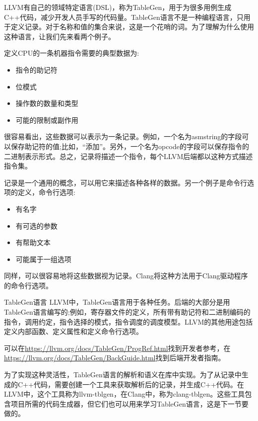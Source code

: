 LLVM有自己的领域特定语言(DSL)，称为TableGen，用于为很多用例生成C++代码，减少开发人员手写的代码量。TableGen语言不是一种编程语言，只用于定义记录。对于名称和值的集合来说，这是一个花哨的词。为了理解为什么使用这种语言，让我们先来看两个例子。

定义CPU的一条机器指令需要的典型数据为:

\begin{itemize}
\item
指令的助记符

\item
位模式

\item
操作数的数量和类型

\item
可能的限制或副作用
\end{itemize}

很容易看出，这些数据可以表示为一条记录。例如，一个名为asmstring的字段可以保存助记符的值;比如，“添加”。另外，一个名为opcode的字段可以保存指令的二进制表示形式。总之，记录将描述一个指令，每个LLVM后端都以这种方式描述指令集。

记录是一个通用的概念，可以用它来描述各种各样的数据。另一个例子是命令行选项的定义，命令行选项:

\begin{itemize}
\item
有名字

\item
有可选的参数

\item
有帮助文本

\item
可能属于一组选项
\end{itemize}

同样，可以很容易地将这些数据视为记录。Clang将这种方法用于Clang驱动程序的命令行选项。

\begin{myTip}{TableGen语言}
LLVM中，TableGen语言用于各种任务。后端的大部分是用TableGen语言编写的;例如，寄存器文件的定义，所有带有助记符和二进制编码的指令，调用约定，指令选择的模式，指令调度的调度模型。LLVM的其他用途包括定义内部函数、定义属性和定义命令行选项。

可以在\url{https://llvm.org/docs/TableGen/ProgRef.html}找到开发者参考，在\url{https://llvm.org/docs/TableGen/BackGuide.html}找到后端开发者指南。
\end{myTip}

为了实现这种灵活性，TableGen语言的解析和语义在库中实现。为了从记录中生成的C++代码，需要创建一个工具来获取解析后的记录，并生成C++代码。在LLVM中，这个工具称为llvm-tblgen，在Clang中，称为clang-tblgen。这些工具包含项目所需的代码生成器，但它们也可以用来学习TableGen语言，这是下一节要做的。






























